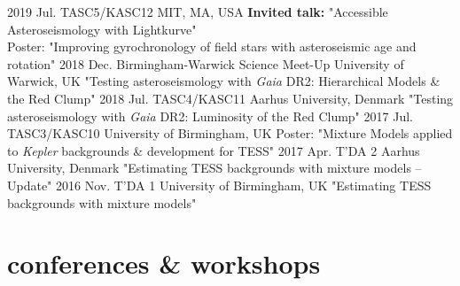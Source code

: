 \documentclass[]{k-cv} %
\begin{document}
\begin{entrylist}
\entry
{2019 Jul.}
{TASC5/KASC12}
{MIT, MA, USA}
{\textbf{Invited talk:} "Accessible Asteroseismology with Lightkurve"\\ \small{Poster: "Improving gyrochronology of field stars with asteroseismic age and rotation"}}
\entry
{2018 Dec.}
{Birmingham-Warwick Science Meet-Up}
{University of Warwick, UK}
{"Testing asteroseismology with \textit{Gaia} DR2: Hierarchical Models \& the Red Clump"}
\entry
{2018 Jul.}
{TASC4/KASC11}
{Aarhus University, Denmark}
{"Testing asteroseismology with \textit{Gaia} DR2: Luminosity of the Red Clump"}
\entry
{2017 Jul.}
{TASC3/KASC10}
{University of Birmingham, UK}
{\small{Poster: "Mixture Models applied to \emph{Kepler} backgrounds \& development for TESS"}}
\entry
{2017 Apr.}
{T'DA 2}
{Aarhus University, Denmark}
{"Estimating TESS backgrounds with mixture models -- Update"}
\entry
{2016 Nov.}
{T'DA 1}
{University of Birmingham, UK}
{"Estimating TESS backgrounds with mixture models"}
\end{entrylist}

\section{conferences \& workshops}
\end{document}
